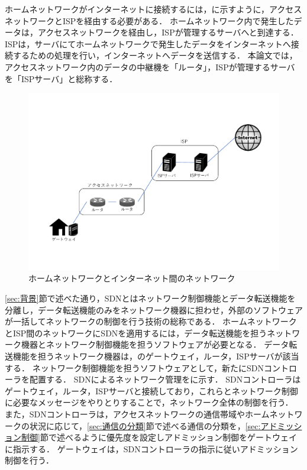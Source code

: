 \documentclass[a4paper,11pt,uplatex]{ujreport}
\begin{document}
  ホームネットワークがインターネットに接続するには，に示すように，アクセスネットワークとISPを経由する必要がある．
  ホームネットワーク内で発生したデータは，アクセスネットワークを経由し，ISPが管理するサーバへと到達する．
  ISPは，サーバにてホームネットワークで発生したデータをインターネットへ接続するための処理を行い，インターネットへデータを送信する．
  本論文では，アクセスネットワーク内のデータの中継機を「ルータ」，ISPが管理するサーバを「ISPサーバ」と総称する．\par

  \begin{figure}[!tb]
    \centering
    \includegraphics[width=\linewidth]{img/ISP_trimmed.pdf}
    \caption{ホームネットワークとインターネット間のネットワーク}
    \label{fig:ISP}
  \end{figure}

  \ref{sec:背景}節で述べた通り，SDNとはネットワーク制御機能とデータ転送機能を分離し，データ転送機能のみをネットワーク機器に担わせ，外部のソフトウェアが一括してネットワークの制御を行う技術の総称である．
  ホームネットワークとISP間のネットワークにSDNを適用するには，データ転送機能を担うネットワーク機器とネットワーク制御機能を担うソフトウェアが必要となる．
  データ転送機能を担うネットワーク機器は，のゲートウェイ，ルータ，ISPサーバが該当する．
  ネットワーク制御機能を担うソフトウェアとして，新たにSDNコントローラを配置する．
  SDNによるネットワーク管理をに示す．
  SDNコントローラはゲートウェイ，ルータ，ISPサーバと接続しており，これらとネットワーク制御に必要なメッセージをやりとりすることで，ネットワーク全体の制御を行う．
  また，SDNコントローラは，アクセスネットワークの通信帯域やホームネットワークの状況に応じて，\ref{sec:通信の分類}節で述べる通信の分類を，\ref{sec:アドミッション制御}節で述べるように優先度を設定しアドミッション制御をゲートウェイに指示する．
  ゲートウェイは，SDNコントローラの指示に従いアドミッション制御を行う．\par
\end{document}
